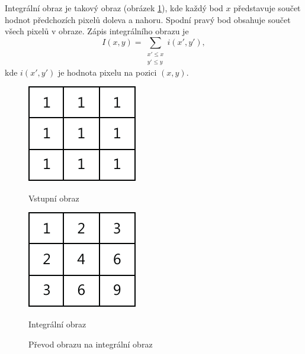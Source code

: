 Integrální obraz je takový obraz (obrázek \ref{fig:integralimage}), kde každý bod $x$ představuje součet hodnot předchozích pixelů doleva a nahoru. Spodní pravý bod obsahuje součet všech pixelů v obraze.
Zápis integrálního obrazu je
\begin{equation*}
\label{integralimage}
 I(x, y) = \sum_{\substack{x' \leq x \\ y' \leq y}}{} i(x', y'),
\end{equation*}
kde $i(x', y')$ je hodnota pixelu na pozici $(x, y)$.
\begin{figure}[H]
\centering
\begin{minipage}{.4\textwidth}
  \centering
  \includegraphics[width=.5\linewidth]{figures/ii_input}
  \caption*{Vstupní obraz}
  \label{fig:ii_input}
\end{minipage}%
\begin{minipage}{.4\textwidth}
  \centering
  \includegraphics[width=.5\linewidth]{figures/ii_output}
  \caption*{Integrální obraz}
  \label{fig:ii_output}
\end{minipage}
\caption{Převod obrazu na integrální obraz}
\label{fig:integralimage}
\end{figure}

